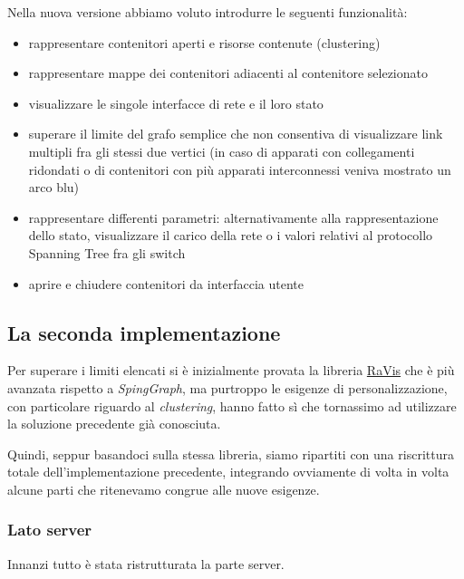 \documentclass[a4wide,10pt,italian]{manual}
\begin{document}
Nella nuova versione abbiamo voluto introdurre le seguenti funzionalità:
\begin{itemize}
\item {} 
rappresentare contenitori aperti e risorse contenute (clustering)

\item {} 
rappresentare mappe dei contenitori adiacenti al contenitore selezionato

\item {} 
visualizzare le singole interfacce di rete e il loro stato

\item {} 
superare il limite del grafo semplice che non consentiva di visualizzare link multipli fra gli stessi due vertici
(in caso di apparati con collegamenti ridondati o di contenitori con più apparati interconnessi veniva mostrato un arco blu)

\item {} 
rappresentare differenti parametri: alternativamente alla rappresentazione dello stato,
visualizzare il carico della rete o i valori relativi al protocollo Spanning Tree fra gli switch

\item {} 
aprire e chiudere contenitori da interfaccia utente

\end{itemize}


\subsection{La seconda implementazione}

Per superare i limiti elencati si è inizialmente provata la libreria \href{http://code.google.com/p/birdeye/}{RaVis}
che è più avanzata rispetto a \emph{SpingGraph}, ma purtroppo le esigenze di personalizzazione,
con particolare riguardo al \emph{clustering}, hanno fatto sì che tornassimo ad utilizzare
la soluzione precedente già conosciuta.

Quindi, seppur basandoci sulla stessa libreria,
siamo ripartiti con una riscrittura totale dell'implementazione precedente,
integrando ovviamente di volta in volta alcune parti che ritenevamo congrue alle nuove esigenze.


\subsubsection{Lato server}

Innanzi tutto è stata ristrutturata la parte server.
\end{document}

